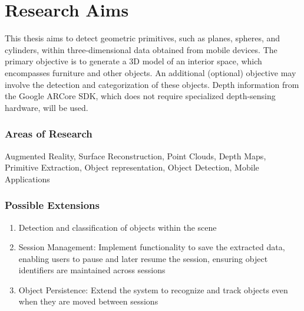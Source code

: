 \chapter*{Research Aims}
This thesis aims to detect geometric primitives, such as planes, spheres, and cylinders,
within three-dimensional data obtained from mobile devices.
The primary objective is to generate a 3D model of an interior space, which encompasses furniture and other objects.
An additional (optional) objective may involve the detection and categorization of these objects.
Depth information from the Google ARCore SDK, which does not require specialized depth-sensing hardware, will be used.

\subsection*{Areas of Research}
Augmented Reality, Surface Reconstruction, Point Clouds, Depth Maps, Primitive Extraction, Object representation, Object Detection, Mobile Applications


\subsection*{Possible Extensions}
\begin{enumerate}
    \item Detection and classification of objects within the scene
    \item Session Management: Implement functionality to save the extracted data, enabling users to pause and later resume the session, ensuring object identifiers are maintained across sessions
    \item Object Persistence: Extend the system to recognize and track objects even when they are moved between sessions
\end{enumerate}


